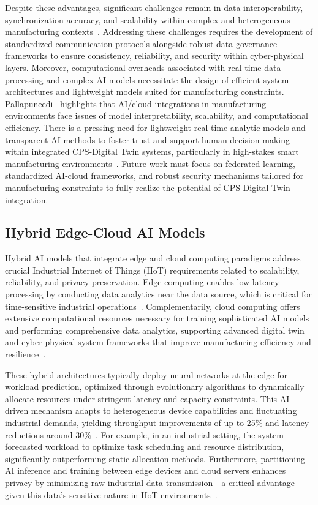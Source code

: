 \documentclass[sigconf]{acmart}
\begin{document}
Despite these advantages, significant challenges remain in data interoperability, synchronization accuracy, and scalability within complex and heterogeneous manufacturing contexts~\cite{ref13}. Addressing these challenges requires the development of standardized communication protocols alongside robust data governance frameworks to ensure consistency, reliability, and security within cyber-physical layers. Moreover, computational overheads associated with real-time data processing and complex AI models necessitate the design of efficient system architectures and lightweight models suited for manufacturing constraints. Pallapuneedi~\cite{ref12} highlights that AI/cloud integrations in manufacturing environments face issues of model interpretability, scalability, and computational efficiency. There is a pressing need for lightweight real-time analytic models and transparent AI methods to foster trust and support human decision-making within integrated CPS-Digital Twin systems, particularly in high-stakes smart manufacturing environments~\cite{ref12}. Future work must focus on federated learning, standardized AI-cloud frameworks, and robust security mechanisms tailored for manufacturing constraints to fully realize the potential of CPS-Digital Twin integration.

\subsection{Hybrid Edge-Cloud AI Models}

Hybrid AI models that integrate edge and cloud computing paradigms address crucial Industrial Internet of Things (IIoT) requirements related to scalability, reliability, and privacy preservation. Edge computing enables low-latency processing by conducting data analytics near the data source, which is critical for time-sensitive industrial operations~\cite{ref15}. Complementarily, cloud computing offers extensive computational resources necessary for training sophisticated AI models and performing comprehensive data analytics, supporting advanced digital twin and cyber-physical system frameworks that improve manufacturing efficiency and resilience~\cite{ref22}.

These hybrid architectures typically deploy neural networks at the edge for workload prediction, optimized through evolutionary algorithms to dynamically allocate resources under stringent latency and capacity constraints. This AI-driven mechanism adapts to heterogeneous device capabilities and fluctuating industrial demands, yielding throughput improvements of up to 25\% and latency reductions around 30\%~\cite{ref31}. For example, in an industrial setting, the system forecasted workload to optimize task scheduling and resource distribution, significantly outperforming static allocation methods. Furthermore, partitioning AI inference and training between edge devices and cloud servers enhances privacy by minimizing raw industrial data transmission—a critical advantage given this data's sensitive nature in IIoT environments~\cite{ref22}.
\end{document}
